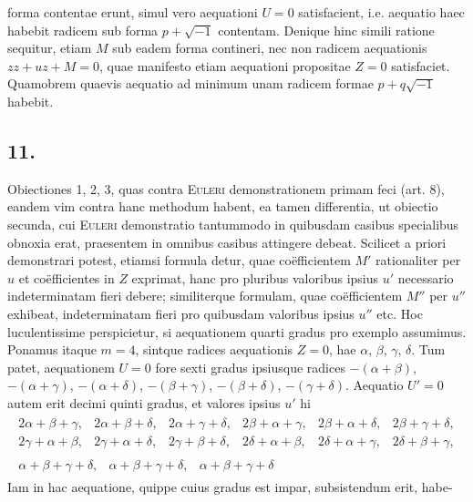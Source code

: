 \documentclass[14pt]{memoir}
\theoremstyle{plain}
\theoremstyle{remark}
\begin{document}
forma contentae erunt, simul vero aequationi \(U=0\) satisfacient, i.e. aequatio haec habebit radicem sub forma \(p + \surd{-1}\) contentam. Denique hinc simili ratione sequitur, etiam \(M\) sub eadem forma contineri, nec non radicem aequationis \(zz+uz+M=0\), quae manifesto etiam aequationi propositae \(Z=0\) satisfaciet. Quamobrem quaevis aequatio ad minimum unam radicem formae \(p+q\surd{-1}\) habebit.

\subsection*{11.}

Obiectiones 1, 2, 3, quas contra \textsc{Euleri} demonstrationem primam feci (art. 8), eandem vim contra hanc methodum habent, ea tamen differentia, ut obiectio secunda, cui \textsc{Euleri} demonstratio tantummodo in quibusdam casibus specialibus obnoxia erat, praesentem in omnibus casibus attingere debeat. Scilicet a priori demonstrari potest, etiamsi formula detur, quae co\"efficientem \(M'\) rationaliter per \(u\) et co\"efficientes in \(Z\) exprimat, hanc pro pluribus valoribus ipsius \(u'\) necessario indeterminatam fieri debere; similiterque formulam, quae co\"efficientem \(M''\) per \(u''\) exhibeat, indeterminatam fieri pro quibusdam valoribus ipsius \(u''\) etc. Hoc luculentissime perspicietur, si aequationem quarti gradus pro exemplo assumimus. Ponamus itaque \(m= 4\), sintque radices aequationis \(Z = 0\), hae \(\alpha\), \(\beta\), \(\gamma\), \(\delta\). Tum patet, aequationem \(U = 0\) fore sexti gradus ipsiusque radices \(-(\alpha+\beta)\), \(-(\alpha+\gamma)\), \(-(\alpha+\delta)\), \(-(\beta+\gamma)\), \(-(\beta+\delta)\), \(-(\gamma+\delta)\). Aequatio \(U'=0\) autem erit decimi quinti gradus, et valores ipsius \(u'\) hi \[ \begin{array}{c} \begin{array}{cccccc} 2\alpha+\beta+\gamma, & 2\alpha + \beta + \delta,& 2\alpha + \gamma + \delta, & 2\beta + \alpha + \gamma,& 2\beta + \alpha + \delta, & 2\beta + \gamma + \delta,\\ 2\gamma+ \alpha + \beta, & 2\gamma + \alpha + \delta,& 2 \gamma + \beta + \delta,& 2 \delta + \alpha + \beta, &2\delta + \alpha + \gamma, &2\delta + \beta + \gamma, \end{array} \\
\begin{array}{ccc} \alpha + \beta + \gamma + \delta, & \alpha + \beta + \gamma + \delta, & \alpha + \beta + \gamma + \delta \end{array} \end{array} \] Iam in hac aequatione, quippe cuius gradus est impar, subsistendum erit, habe-
\end{document}
